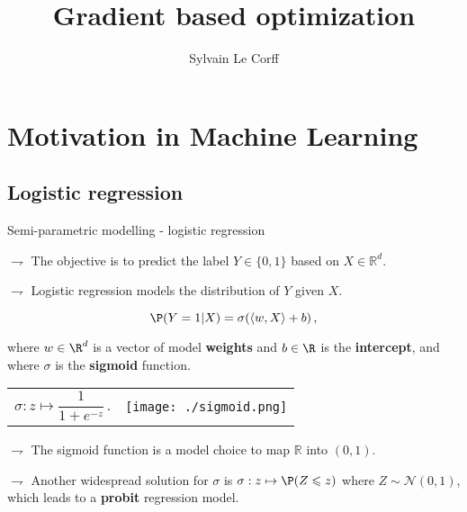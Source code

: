 \documentclass[xcolor={usenames,dvipsnames}]{beamer}
\begin{document}
\title[]{Gradient based optimization}
\author[S.~Le Corff]{Sylvain Le Corff}
\date{}

\begin{frame}[plain]
\titlepage
\end{frame}


\section{Motivation in Machine Learning}

\subsection{Logistic regression}

\begin{frame}{Semi-parametric modelling - logistic regression}


$\rightharpoondown$ The objective is to \alert{predict the  label $Y\in\{0,1\}$} based on $X\in\mathbb{R}^d$.

$\rightharpoondown$ Logistic regression \alert{models the distribution of $Y$ given $X$}.

\vspace{-.2cm}

\begin{equation*}
\P(Y = 1| X) = \sigma(\langle w,X \rangle + b)\,,
\end{equation*}

where $w \in \R^d$ is a vector of model \textbf{weights} and $b \in \R$ is the \textbf{intercept}, and where $\sigma$ is the \textbf{sigmoid} function.

\vspace{.3cm}
 
\begin{tabular}{cc}
	\begin{minipage}{0.4\textwidth}
		\begin{equation*}
		\sigma: z \mapsto \frac{1}{1 + e^{-z}}\,.
		\end{equation*}%
	\end{minipage}
	&
	\begin{minipage}{0.4\textwidth}
		\texttt{[image: ./sigmoid.png]}  
	\end{minipage}    
\end{tabular}

$\rightharpoondown$ The sigmoid function is a \alert{model choice to map $\mathbb{R}$ into $(0,1)$}.

$\rightharpoondown$ Another widespread solution for $\sigma$ is $\sigma: z \mapsto  \P( Z \leqslant z)$ where $Z\sim \mathcal{N}(0,1)$, which leads to a \textbf{probit} regression model.

\end{frame}
\end{document}
